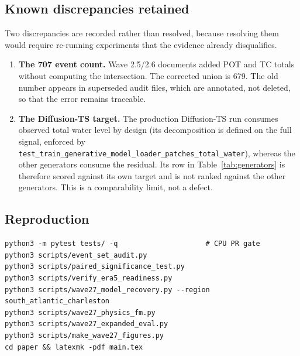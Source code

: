 \subsection{Known discrepancies retained}

Two discrepancies are recorded rather than resolved, because resolving them
would require re-running experiments that the evidence already disqualifies.

\begin{enumerate}
    \item \textbf{The 707 event count.} Wave 2.5/2.6 documents added POT and TC
    totals without computing the intersection. The corrected union is 679. The
    old number appears in superseded audit files, which are annotated, not
    deleted, so that the error remains traceable.
    \item \textbf{The Diffusion-TS target.} The production Diffusion-TS run
    consumes observed total water level by design (its decomposition is defined
    on the full signal, enforced by
    \texttt{test\_train\_generative\_model\_loader\_patches\_total\_water}),
    whereas the other generators consume the residual. Its row in
    Table~\ref{tab:generators} is therefore scored against its own target and is
    not ranked against the other generators. This is a comparability limit, not
    a defect.
\end{enumerate}

\subsection{Reproduction}

\begin{verbatim}
python3 -m pytest tests/ -q                     # CPU PR gate
python3 scripts/event_set_audit.py
python3 scripts/paired_significance_test.py
python3 scripts/verify_era5_readiness.py
python3 scripts/wave27_model_recovery.py --region south_atlantic_charleston
python3 scripts/wave27_physics_fm.py
python3 scripts/wave27_expanded_eval.py
python3 scripts/make_wave27_figures.py
cd paper && latexmk -pdf main.tex
\end{verbatim}
